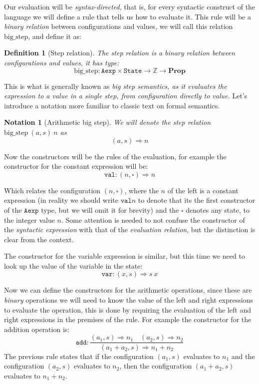 \documentclass[
  a4paper, 
  10pt, 
  parskip=half, 
  DIV=20,
  toc=bibliography,
  usegeometry,
]{scrartcl}
\newtheorem{definition}[theorem]{Definition}
\newtheorem{notation}[theorem]{Notation}
\newcommand{\funfont}[1]{\text{#1}}
\newcommand{\tyfont}[1]{\texttt{#1}}
\newcommand{\Prop}{\mathbf{Prop}}
\newcommand{\bigstep}{\Longrightarrow}
\begin{document}
Our evaluation will be \emph{syntax-directed}, that is, for every syntactic
construct of the language we will define a rule that tells us how to evaluate
it. This rule will be a \emph{binary relation} between configurations and values,
we will call this relation \(\funfont{big\_step}\), and define it as:

\begin{definition}[Step relation]
  The step relation is a binary relation between configurations and values, it 
  has type:
  \[
  \funfont{big\_step} : \tyfont{Aexp} \times \tyfont{State} \to \mathbb{Z} \to \Prop
  \]  
\end{definition}

This is what is generally known as \emph{big step semantics, as it evaluates
the expression to a value in a single step, from configuration directly to value.}
Let's introduce a notation more familiar to classic text on formal semantics.
\begin{notation}[Arithmetic big step]
  We will denote the step relation \(\funfont{big\_step} \ (a, s) \ n\) as
  \[
  (a, s) \bigstep n
  \]
\end{notation}

Now the constructors will be the rules of the evaluation, for example the
constructor for the constant expression will be:
\[
  \texttt{val} : (n, \square) \bigstep n
\]

Which relates the configuration \((n, \square)\), where the \(n\) of the left is
a constant expression (in reality we should write \(\texttt{val} n\) 
to denote that its the first constructor of the \(\tyfont{Aexp}\) type, but
we will omit it for brevity) and the \(\square\) denotes any state, to the
integer value \(n\). Some attention is needed to not confuse the constructor
of the \emph{syntactic expression} with that of the \emph{evaluation relation},
but the distinction is clear from the context.

The constructor for the variable expression is similar, but this time we need
to look up the value of the variable in the state:
\[
  \texttt{var} : (x, s) \bigstep s \ x
\]

Now we can define the constructors for the arithmetic operations, since these 
are \emph{binary} operations we will need to know the value of the left and
right expressions to evaluate the operation, this is done by requiring
the evaluation of the left and right expressions in the premises of the rule.
For example the constructor for the addition operation is:
\[
  \texttt{add} : \frac{(a_1, s) \bigstep n_1 \quad (a_2, s) \bigstep n_2}
   {(a_1 + a_2, s) \bigstep n_1 + n_2}
\]
The previous rule states that if the configuration \((a_1, s)\) evaluates to
\(n_1\) and the configuration \((a_2, s)\) evaluates to \(n_2\), then the
configuration \((a_1 + a_2, s)\) evaluates to \(n_1 + n_2\).
\end{document}
